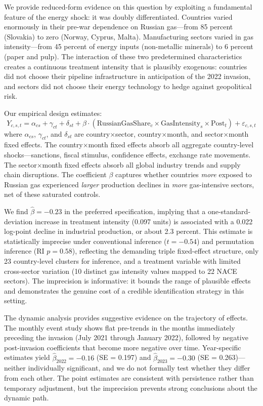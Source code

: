 \documentclass[12pt]{article}
\begin{document}
We provide reduced-form evidence on this question by exploiting a fundamental feature of the energy shock: it was doubly differentiated. Countries varied enormously in their pre-war dependence on Russian gas---from 85 percent (Slovakia) to zero (Norway, Cyprus, Malta). Manufacturing sectors varied in gas intensity---from 45 percent of energy inputs (non-metallic minerals) to 6 percent (paper and pulp). The interaction of these two predetermined characteristics creates a continuous treatment intensity that is plausibly exogenous: countries did not choose their pipeline infrastructure in anticipation of the 2022 invasion, and sectors did not choose their energy technology to hedge against geopolitical risk.

Our empirical design estimates:
\begin{equation}
Y_{c,s,t} = \alpha_{cs} + \gamma_{ct} + \delta_{st} + \beta \cdot (\text{RussianGasShare}_c \times \text{GasIntensity}_s \times \text{Post}_t) + \varepsilon_{c,s,t}
\label{eq:main}
\end{equation}
where $\alpha_{cs}$, $\gamma_{ct}$, and $\delta_{st}$ are country$\times$sector, country$\times$month, and sector$\times$month fixed effects. The country$\times$month fixed effects absorb all aggregate country-level shocks---sanctions, fiscal stimulus, confidence effects, exchange rate movements. The sector$\times$month fixed effects absorb all global industry trends and supply chain disruptions. The coefficient $\beta$ captures whether countries \textit{more} exposed to Russian gas experienced \textit{larger} production declines in \textit{more} gas-intensive sectors, net of these saturated controls.

We find $\hat{\beta} = -0.23$ in the preferred specification, implying that a one-standard-deviation increase in treatment intensity (0.097 units) is associated with a 0.022 log-point decline in industrial production, or about 2.3 percent. This estimate is statistically imprecise under conventional inference ($t = -0.54$) and permutation inference (RI $p = 0.58$), reflecting the demanding triple fixed-effect structure, only 23 country-level clusters for inference, and a treatment variable with limited cross-sector variation (10 distinct gas intensity values mapped to 22 NACE sectors). The imprecision is informative: it bounds the range of plausible effects and demonstrates the genuine cost of a credible identification strategy in this setting.

The dynamic analysis provides suggestive evidence on the trajectory of effects. The monthly event study shows flat pre-trends in the months immediately preceding the invasion (July 2021 through January 2022), followed by negative post-invasion coefficients that become more negative over time. Year-specific estimates yield $\hat{\beta}_{2022} = -0.16$ (SE = 0.197) and $\hat{\beta}_{2023} = -0.30$ (SE = 0.263)---neither individually significant, and we do not formally test whether they differ from each other. The point estimates are consistent with persistence rather than temporary adjustment, but the imprecision prevents strong conclusions about the dynamic path.
\end{document}
